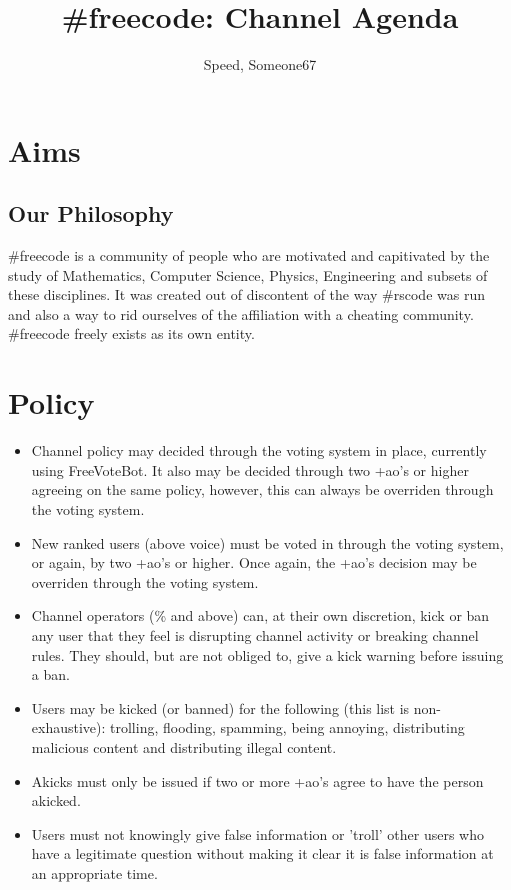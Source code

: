 \documentclass[11pt,a4paper,notitlepage]{article}
\title{\#freecode: Channel Agenda}
\author{Speed, Someone67}
\begin{document}
\maketitle

\section{Aims}
\subsection{Our Philosophy}
\#freecode is a community of people who are motivated and capitivated by the study of Mathematics, Computer Science, Physics, Engineering and subsets of these disciplines.
It was created out of  discontent of the way \#rscode was run and also a way to rid ourselves of the affiliation with a cheating community.
\#freecode freely exists as its own entity.

\section{Policy}
\begin{itemize}
\item Channel policy may decided through the voting system in place, currently using FreeVoteBot.
It also may be decided through two +ao's or higher agreeing on the same policy, however, this can always be overriden through the voting system.
\item New ranked users (above voice) must be voted in through the voting system, or again, by two +ao's or higher.
Once again, the +ao's decision may be overriden through the voting system.
\item Channel operators (\% and above) can, at their own discretion, kick or ban any user that they feel is disrupting channel activity or breaking channel rules.
They should, but are not obliged to, give a kick warning before issuing a ban.
\item Users may be kicked (or banned) for the following (this list is non-exhaustive): trolling, flooding, spamming, being annoying, distributing malicious content and distributing illegal content. 
\item Akicks must only be issued if two or more +ao's agree to have the person akicked. 
\item Users must not knowingly give false information or 'troll' other users who have a legitimate question without making it clear it is false information at an appropriate time.
\end{itemize}
\end{document}
